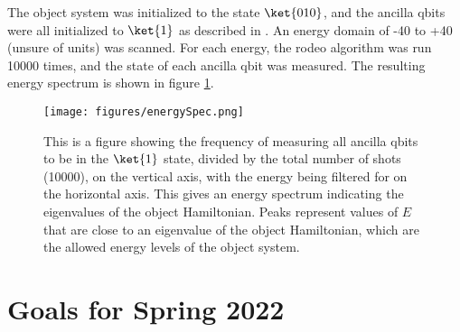 \documentclass[
a4paper,
10pt,
twoside,
prd,
aps,
nofootinbib,
superscriptaddress,
floatfix,
preprintnumbers,
twocolumn
]{revtex4}
\begin{document}
The object system was initialized to the state $\ket{010}$, and the ancilla qbits were all initialized to $\ket{1}$ as described in \cite{Choi_2021}.
An energy domain of -40 to +40 (unsure of units) was scanned.
For each energy, the rodeo algorithm was run 10000 times, and the state of each ancilla qbit was measured.
The resulting energy spectrum is shown in figure \ref{fig: energy_spectrum}.

\begin{figure}[H]
    \centering
    \texttt{[image: figures/energySpec.png]}
    \caption{%
    This is a figure showing the frequency of measuring all ancilla qbits to be in the $\ket{1}$ state, divided by the total number of shots (10000), on the vertical axis, with the energy being filtered for on the horizontal axis.
    This gives an energy spectrum indicating the eigenvalues of the object Hamiltonian.
    Peaks represent values of $E$ that are close to an eigenvalue of the object Hamiltonian, which are the allowed energy levels of the object system.
    }
    \label{fig: energy_spectrum}
\end{figure}


\section{Goals for Spring 2022}


\nocite{*}
\printbib

\stopmcols
\end{document}
